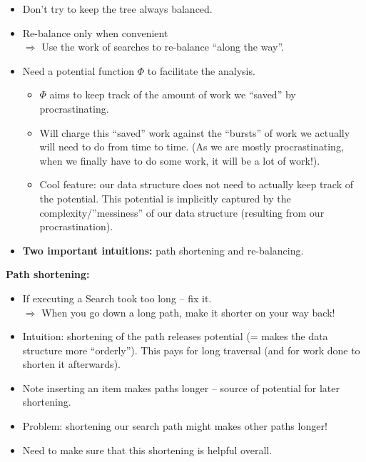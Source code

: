 \documentclass{article}
\begin{document}
\begin{itemize}
\item Don't try to keep the tree always balanced.
\item Re-balance only when convenient\\ $\Rightarrow$ Use the work of searches to re-balance ``along the way''.
\item Need a potential function $\Phi$ to facilitate the analysis.
\begin{itemize}
\item $\Phi$ aims to keep track of the amount of work we ``saved'' by procrastinating.
\item Will charge this ``saved'' work against the ``bursts'' of work we actually will need to do from time to time. (As we are mostly procrastinating, when we finally have to do some work, it will be a lot of work!).
\item Cool feature: our data structure does not need to actually keep track of the potential. This potential is implicitly captured by the complexity/''messiness'' of our data structure (resulting from our procrastination).
\end{itemize}
\item {\bf Two important intuitions:} path shortening and re-balancing.
\end{itemize}



{\bf Path shortening:}

\begin{itemize}
\item If executing a Search took too long -- fix it. \\
$\Rightarrow$ When you go down a long path, make it shorter on your way back!
\item Intuition: shortening of the path releases potential (= makes the data structure more ``orderly''). This pays for
  long traversal (and for work done to shorten it afterwards).
\item Note inserting an item makes paths longer -- source of potential for later shortening.
\item Problem: shortening our search path might makes other paths longer!
\item Need to make sure that this shortening is helpful overall.
\end{itemize}
\end{document}
